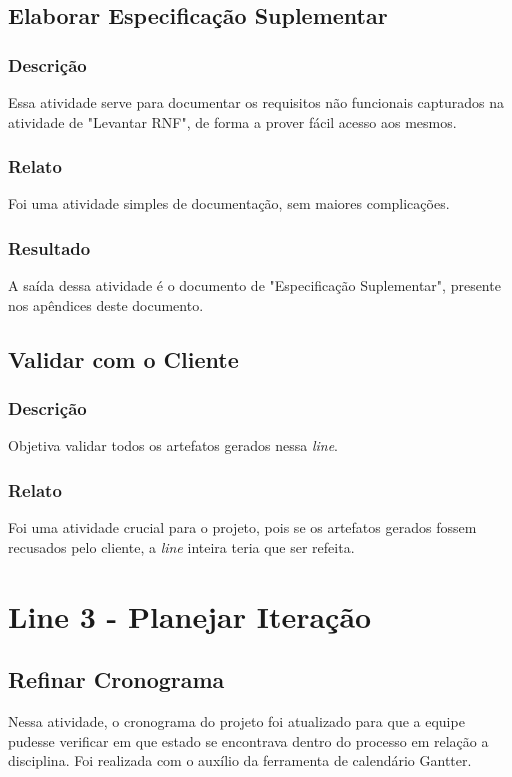 \subsection{Elaborar Especificação Suplementar}
\subsubsection{Descrição}
Essa atividade serve para documentar os requisitos não funcionais capturados na atividade de "Levantar RNF", de forma a prover fácil acesso aos mesmos.

\subsubsection{Relato}
Foi uma atividade simples de documentação, sem maiores complicações.

\subsubsection{Resultado}
A saída dessa atividade é o documento de "Especificação Suplementar", presente nos apêndices deste documento.

\subsection{Validar com o Cliente}
\subsubsection{Descrição}
Objetiva validar todos os artefatos gerados nessa \textit{line}.

\subsubsection{Relato}
Foi uma atividade crucial para o projeto, pois se os artefatos gerados fossem recusados pelo cliente, a \textit{line} inteira teria que ser refeita.

\section{Line 3 - Planejar Iteração}

\subsection{Refinar Cronograma}
Nessa atividade, o cronograma do projeto foi atualizado para que a equipe pudesse verificar em que estado se encontrava dentro do processo em relação a disciplina. Foi realizada com o auxílio da ferramenta de calendário Gantter.

